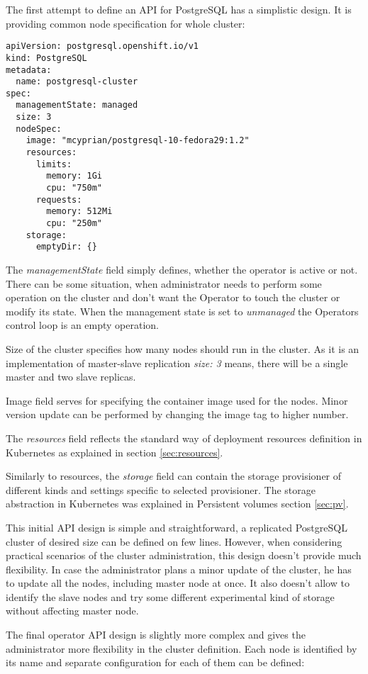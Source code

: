 \documentclass[
  digital, %
  twoside, %
  table,   %
  lof,     %
  lot,     %
]{fithesis3}
\begin{document}
The first attempt to define an API for PostgreSQL has a simplistic design.
It is providing common node specification for whole cluster:

\begin{lstlisting}
apiVersion: postgresql.openshift.io/v1
kind: PostgreSQL
metadata:
  name: postgresql-cluster
spec:
  managementState: managed
  size: 3
  nodeSpec:
    image: "mcyprian/postgresql-10-fedora29:1.2"
    resources:
      limits:
        memory: 1Gi
        cpu: "750m"
      requests:
        memory: 512Mi
        cpu: "250m"
    storage:
      emptyDir: {}
\end{lstlisting}

The \textit{managementState} field simply defines, whether the operator is active or not. There can be some situation, when administrator needs to perform some operation on the cluster and don't want the Operator to touch the cluster or modify its state. When the management state is set to \textit{unmanaged} the Operators control loop is an empty operation.

Size of the cluster specifies how many nodes should run in the cluster. As it is an implementation of master-slave replication \textit{size: 3} means, there will be a single master and two slave replicas.

Image field serves for specifying the container image used for the nodes. Minor version update can be performed by changing the image tag to higher number.

The \textit{resources} field reflects the standard way of deployment resources definition in Kubernetes as explained in section \ref{sec:resources}.

Similarly to resources, the \textit{storage} field can contain the storage provisioner of different kinds and settings specific to selected provisioner. The storage abstraction in Kubernetes was explained in Persistent volumes section \ref{sec:pv}.

This initial API design is simple and straightforward, a replicated PostgreSQL cluster of desired size can be defined on few lines. However, when considering practical scenarios of the cluster administration, this design doesn't provide much flexibility. In case the administrator plans a minor update of the cluster, he has to update all the nodes, including master node at once. It also doesn't allow to identify the slave nodes and try some different experimental kind of storage without affecting master node.

The final operator API design is slightly more complex and gives the administrator more flexibility in the cluster definition. Each node is identified by its name and separate configuration for each of them can be defined:
\end{document}
